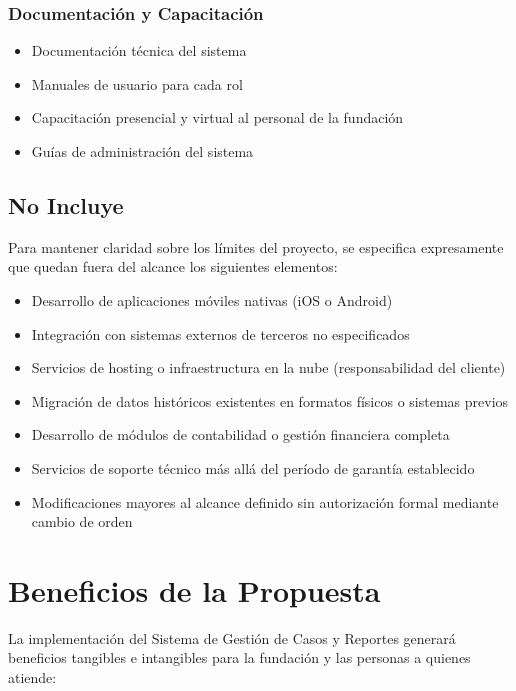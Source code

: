 \documentclass[12pt,letterpaper]{article}
\begin{document}
\subsubsection{Documentación y Capacitación}
\begin{itemize}
    \item Documentación técnica del sistema
    \item Manuales de usuario para cada rol
    \item Capacitación presencial y virtual al personal de la fundación
    \item Guías de administración del sistema
\end{itemize}

\subsection{No Incluye}

Para mantener claridad sobre los límites del proyecto, se especifica expresamente que quedan fuera del alcance los siguientes elementos:

\begin{itemize}
    \item Desarrollo de aplicaciones móviles nativas (iOS o Android)
    \item Integración con sistemas externos de terceros no especificados
    \item Servicios de hosting o infraestructura en la nube (responsabilidad del cliente)
    \item Migración de datos históricos existentes en formatos físicos o sistemas previos
    \item Desarrollo de módulos de contabilidad o gestión financiera completa
    \item Servicios de soporte técnico más allá del período de garantía establecido
    \item Modificaciones mayores al alcance definido sin autorización formal mediante cambio de orden
\end{itemize}

\newpage

\section{Beneficios de la Propuesta}

La implementación del Sistema de Gestión de Casos y Reportes generará beneficios tangibles e intangibles para la fundación y las personas a quienes atiende:
\end{document}
